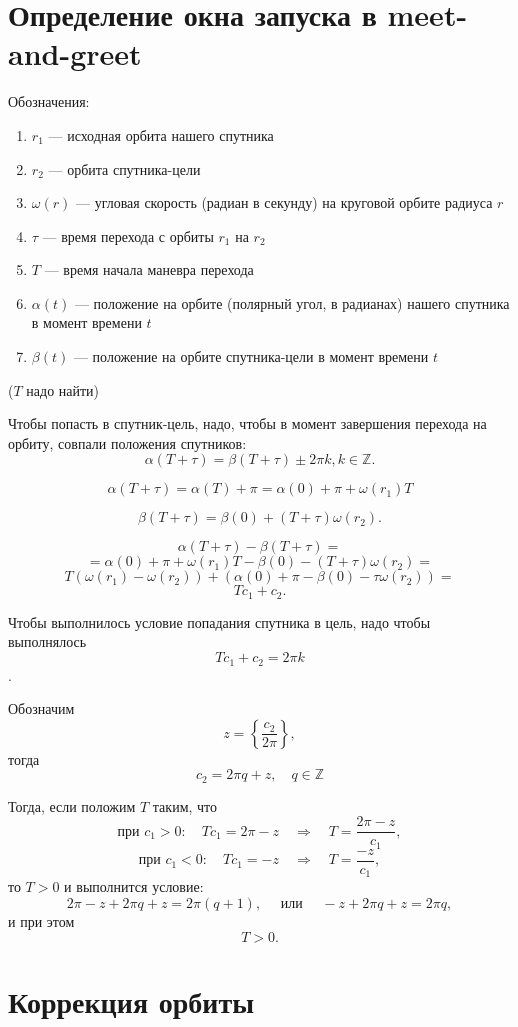 \documentclass[a4paper]{article}
\begin{document}
\section{Определение окна запуска в meet-and-greet}

Обозначения:
\begin{enumerate}
\item $r_1$ --- исходная орбита нашего спутника
\item $r_2$ --- орбита спутника-цели
\item $\omega(r)$ --- угловая скорость (радиан в секунду) на круговой орбите радиуса $r$
\item $\tau$ --- время перехода с орбиты $r_1$ на $r_2$
\item $T$ --- время начала маневра перехода
\item $\alpha(t)$ --- положение на орбите (полярный угол, в радианах) нашего спутника в момент времени $t$
\item $\beta(t)$ --- положение на орбите спутника-цели в момент времени $t$
\end{enumerate}

($T$ надо найти)

Чтобы попасть в спутник-цель, надо, чтобы в момент завершения перехода на орбиту, совпали положения спутников:$$\alpha(T+\tau)=\beta(T+\tau)\pm2\pi k,k\in\mathbb{Z}.$$

$$\alpha(T+\tau)=\alpha(T)+\pi=\alpha(0)+\pi+\omega(r_1)T$$

$$\beta(T+\tau)=\beta(0)+(T+\tau)\omega(r_2).$$

$$\alpha(T+\tau)-\beta(T+\tau)=$$
$$=\alpha(0)+\pi+\omega(r_1)T-\beta(0)-(T+\tau)\omega(r_2)=$$
$$T(\omega(r_1)-\omega(r_2))+(\alpha(0)+\pi-\beta(0)-\tau\omega(r_2))=$$
$$Tc_1+c_2.$$

Чтобы выполнилось условие попадания спутника в цель, надо чтобы выполнялось
$$Tc_1+c_2=2\pi k$$.

Обозначим $$z=\left\{\frac{c_2}{2\pi}\right\},$$ тогда $$c_2=2\pi q+z,\quad q\in\mathbb Z$$

Тогда, если положим $T$ таким, что $$\mbox{при } c_1>0: \quad Tc_1=2\pi-z\quad\Rightarrow\quad T=\frac{2\pi-z}{c_1},$$
$$\mbox{при } c_1<0: \quad Tc_1=-z\quad\Rightarrow\quad T=\frac{-z}{c_1},$$ то $T>0$ и выполнится условие:
$$2\pi-z+2\pi q+z=2\pi (q+1),\quad\mbox{ или }\quad -z+2\pi q+z=2\pi q,$$
и при этом $$T>0.$$

\section{Коррекция орбиты}
\end{document}
